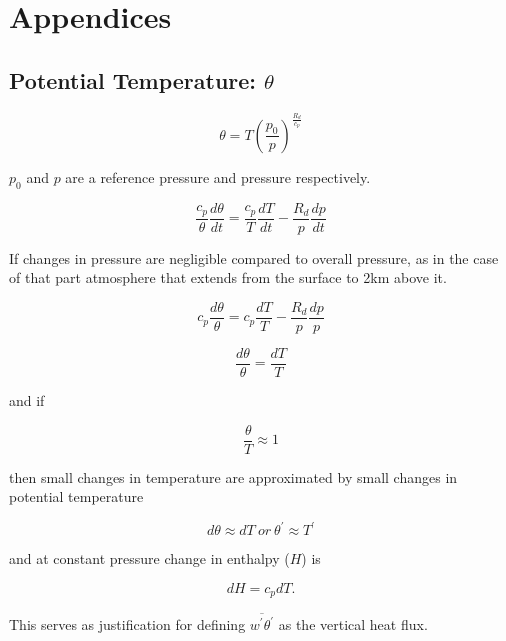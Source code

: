 \chapter{Appendices}
\section{Potential Temperature: $\theta$}

\label{sec:pottemp}

\begin{equation}
\theta = T \left(\frac{p_{0}}{p} \right)^{\frac{R_{d}}{c_{p}}} 
\end{equation}

$p_{0}$ and $p$ are a reference pressure and pressure respectively. 

\begin{equation}
\frac{c_{p}}{\theta}\frac{d\theta}{dt} = \frac{c_{p}}{T} \frac{dT}{dt} - \frac{R_{d}}{p}\frac{dp}{dt} 
\end{equation}

If changes in pressure are negligible compared to overall pressure, as in the case of that part atmosphere that extends from the surface to 2km above it. 

\begin{equation}
c_{p}\frac{d\theta}{\theta} = c_{p}\frac{dT}{T} - \frac{R_{d}}{p}\frac{dp}{p} 
\end{equation}

\begin{equation}
\frac{d\theta}{\theta} = \frac{dT}{T} 
\end{equation}

and if 

\begin{equation}
\frac{\theta}{T} \approx 1 
\end{equation}

then small changes in temperature are approximated by small changes in potential temperature

\begin{equation}
d\theta \approx dT \ or \ \theta^{'} \approx T^{'}
\end{equation}

and at constant pressure change in enthalpy ($H$) is 

\begin{equation}
dH = c_{p}dT.
\end{equation}

This serves as justification for defining $\overline{w^{'}\theta^{'}}$ as the vertical heat flux.

